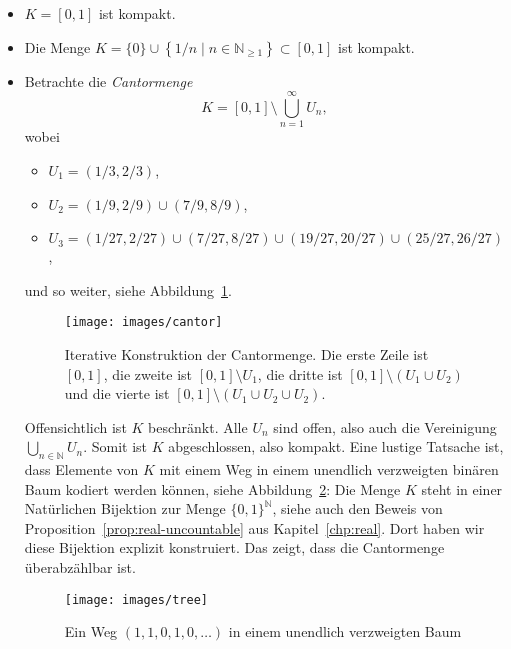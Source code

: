 \documentclass[../main.tex]{subfiles}
\begin{document}
\newpage
\begin{examples}
  \leavevmode
  \begin{itemize}
    \item $K = [0, 1]$ ist kompakt.
    \item Die Menge
      $
        K = \{0\} \cup \left\{1/n \mid n \in \mathbb{N}_{\geq 1}\right\} 
        \subset [0, 1]
      $
      ist kompakt.
    \item 
      Betrachte die \emph{Cantormenge}
      \[
        K = [0, 1] \setminus \bigcup_{n=1}^{\infty} U_n,
      \]
      wobei
      \begin{itemize}
        \item $U_1 = (1/3, 2/3)$,
        \item $U_2 = (1/9, 2/9) \cup (7/9, 8/9)$,
        \item $U_3 = (1/27, 2/27) \cup (7/27, 8/27) \cup (19/27, 20/27) \cup (25/27, 26/27)$,
      \end{itemize}
      und so weiter,
      siehe Abbildung~\ref{fig:cantor}.

      \begin{figure}[htb]
        \centering
        \texttt{[image: images/cantor]}
        \caption{Iterative Konstruktion der
        Cantormenge. Die erste Zeile ist
        $[0, 1]$, die zweite ist
        $[0, 1] \setminus U_1$, die dritte ist
        $[0, 1] \setminus (U_1 \cup U_2)$ und die
        vierte ist $[0, 1] \setminus (U_1 \cup U_2 \cup U_2)$.}%
        \label{fig:cantor}
      \end{figure}

      Offensichtlich ist $K$ beschränkt.
      Alle $U_n$ sind offen, also auch
      die Vereinigung $\bigcup_{n \in \mathbb{N}} U_n$.
      Somit ist $K$ abgeschlossen, also kompakt.
      Eine lustige Tatsache ist,
      dass Elemente von $K$ mit einem Weg
      in einem unendlich
      verzweigten binären Baum kodiert werden können,
      siehe Abbildung~\ref{fig:tree}:
      Die Menge $K$ steht in einer Natürlichen
      Bijektion zur Menge ${\{0, 1\}}^{\mathbb{N}}$,
      siehe auch den Beweis von 
      Proposition~\ref{prop:real-uncountable}
      aus Kapitel~\ref{chp:real}.
      Dort haben wir diese Bijektion explizit konstruiert.
      Das zeigt, dass die Cantormenge überabzählbar ist.

      \begin{figure}[htb]
        \centering
        \texttt{[image: images/tree]}
        \caption{Ein Weg $(1,1,0,1,0, \dots)$ in einem unendlich
        verzweigten Baum}%
        \label{fig:tree}
      \end{figure}
  \end{itemize}
\end{examples}
\end{document}

